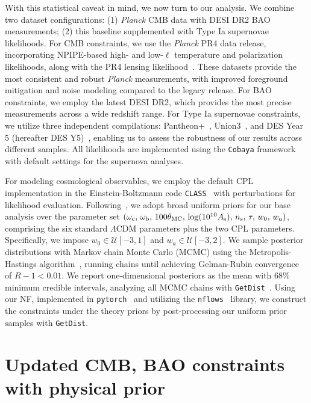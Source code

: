 With this statistical caveat in mind, we now turn to our analysis. We combine two dataset configurations:  (1) \textit{Planck} CMB data with DESI DR2 BAO measurements; (2) this baseline supplemented with Type Ia supernovae likelihoods.
For CMB constraints, we use the \textit{Planck} PR4 data release, incorporating NPIPE-based high- and low-$\ell$ temperature and polarization likelihoods, along with the PR4 lensing likelihood~\cite{Efstathiou:2019mdh,Rosenberg:2022sdy,Carron:2022eyg}. These datasets provide the most consistent and robust \textit{Planck} measurements, with improved foreground mitigation and noise modeling compared to the legacy release.
For BAO constraints, we employ the latest DESI DR2, which provides the most precise  measurements across a wide redshift range. For Type Ia supernovae constraints, we utilize three independent compilations: Pantheon+~\cite{Scolnic:2021amr,Brout:2022vxf}, Union3~\cite{Rubin:2023jdq}, and DES Year 5 (hereafter DES Y5)~\cite{DES:2024jxu}, enabling us to assess the robustness of our results across different samples. All likelihoods are implemented using the \texttt{Cobaya} framework~\citep{Torrado:2020dgo} with default settings for the supernova analyses.

For modeling cosmological observables, we employ the default CPL implementation in the Einstein-Boltzmann code \texttt{CLASS}~\cite{Blas:2011rf} with perturbations for likelihood evaluation. Following~\cite{DESI:2025zgx}, we adopt broad uniform priors for our base analysis over the parameter set $(\omega_{\rm c}, \,\omega_{\rm b},\, 100\theta_{\rm MC},\, \log(10^{10}A_{\rm s}),\, n_{\rm s},\, \tau,\, w_0,\, w_a)$, comprising the six standard $\Lambda$CDM parameters plus the two CPL parameters. Specifically, we impose $w_0 \in \mathcal{U}[-3,1]$ and $w_a \in \mathcal{U}[-3,2]$. We sample posterior distributions with Markov chain Monte Carlo (MCMC) using the Metropolis-Hastings algorithm~\cite{2005math......2099N}, running chains until achieving Gelman-Rubin convergence~\cite{10.1214/ss/1177011136} of $R - 1 < 0.01$. We report one-dimensional posteriors as the mean with 68\% minimum credible intervals, analyzing all MCMC chains with \texttt{GetDist}~\cite{Lewis:2019xzd}. Using our NF, implemented in \texttt{pytorch}~\cite{2019arXiv191201703P} and utilizing the \texttt{nflows}~\cite{nflows} library, we construct the constraints under the theory priors by post-processing our uniform prior samples with \texttt{GetDist}.



\section{Updated CMB, BAO constraints with physical prior}\label{sec:ch11-Results}


